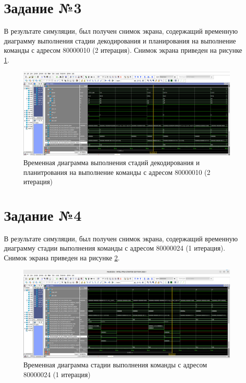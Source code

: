 \section{Задание №3}
В результате симуляции, был получен снимок экрана, содержащий временную диаграмму выполнения стадии декодирования и планирования на выполнение команды с адресом 80000010 (2 итерация). Снимок экрана приведен на рисунке \ref{decode}.

\begin{figure}[h!p]
	\centering
	\includegraphics[width = \linewidth]{../img/decode.png}
	\caption{Временная диаграмма выполнения стадий декодирования и планитрования на выполнение команды с адресом 80000010 (2 итерация)}
	\label{decode}
\end{figure}

\section{Задание №4}
В результате симуляции, был получен снимок экрана, содержащий временную диаграмму стадии выполнения команды с адресом 80000024 (1 итерация). Снимок экрана приведен на рисунке \ref{exec}.

\begin{figure}[h!p]
	\centering
	\includegraphics[width = \linewidth]{../img/exec.png}
	\caption{Временная диаграмма стадии выполнения команды с адресом 80000024 (1 итерация)}
	\label{exec}
\end{figure}

